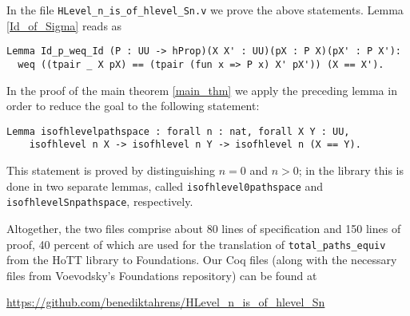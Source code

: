 \documentclass[11pt]{amsart}
\theoremstyle{plain}
\theoremstyle{definition}
\begin{document}
In the file {\verb+HLevel_n_is_of_hlevel_Sn.v+} we prove the above statements.
Lemma \ref{Id_of_Sigma} reads as
\begin{lstlisting}
Lemma Id_p_weq_Id (P : UU -> hProp)(X X' : UU)(pX : P X)(pX' : P X'): 
  weq ((tpair _ X pX) == (tpair (fun x => P x) X' pX')) (X == X').
\end{lstlisting}
In the proof of the main theorem \ref{main_thm} we apply the preceding lemma in order to 
reduce the goal to the following statement:
\begin{lstlisting}
Lemma isofhlevelpathspace : forall n : nat, forall X Y : UU,
    isofhlevel n X -> isofhlevel n Y -> isofhlevel n (X == Y).
\end{lstlisting}
This statement is proved by distinguishing $n = 0$ and $n > 0$; in the library this is done in 
two separate lemmas, called \lstinline!isofhlevel0pathspace! and \lstinline!isofhlevelSnpathspace!,
respectively.

Altogether, the two files comprise about 80 lines of specification and 150 lines of proof, 40 percent of which
are used for the translation of \lstinline!total_paths_equiv! from the \textsf{HoTT} library to 
\textsf{Foundations}.
Our \textsf{Coq} files (along with the necessary files from Voevodsky's \textsf{Foundations} repository) can be found at
\begin{center}
 \url{https://github.com/benediktahrens/HLevel_n_is_of_hlevel_Sn}
\end{center}



\end{document}
